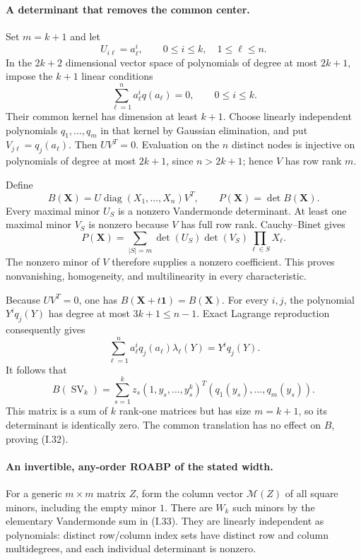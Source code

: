 \documentclass[11pt,a4paper]{article}
\theoremstyle{definition}\newtheorem{definition}{Definition}
\begin{document}
\paragraph{A determinant that removes the common center.}
Set $m=k+1$ and let
\[
 U_{i\ell}=a_\ell^i,\qquad 0\le i\le k,\quad1\le\ell\le n.
\]
In the $2k+2$ dimensional vector space of polynomials of degree
at most $2k+1$, impose the $k+1$ linear conditions
\[
 \sum_{\ell=1}^n a_\ell^i q(a_\ell)=0,
       \qquad0\le i\le k.
\]
Their common kernel has dimension at least $k+1$.
Choose linearly independent polynomials
$q_1,\ldots,q_m$ in that kernel by Gaussian elimination, and
put $V_{j\ell}=q_j(a_\ell)$.  Then $UV^T=0$.
Evaluation on the $n$ distinct nodes is injective on polynomials
of degree at most $2k+1$, since $n>2k+1$; hence $V$ has row
rank $m$.

Define
\[
 B(\mathbf X)=U\operatorname{diag}(X_1,\ldots,X_n)V^T,
 \qquad P(\mathbf X)=\det B(\mathbf X).
 \tag{I.34}
\]
Every maximal minor $U_S$ is a nonzero Vandermonde determinant.
At least one maximal minor $V_S$ is nonzero because $V$ has
full row rank.  Cauchy--Binet gives
\[
 P(\mathbf X)=\sum_{|S|=m}\det(U_S)\det(V_S)
                                  \prod_{\ell\in S}X_\ell.
\]
The nonzero minor of $V$ therefore supplies a nonzero coefficient.
This proves nonvanishing, homogeneity, and multilinearity in
every characteristic.

Because $UV^T=0$, one has $B(\mathbf X+t\mathbf1)=B(\mathbf X)$.
For every $i,j$, the polynomial $Y^i q_j(Y)$ has degree at most
$3k+1\le n-1$.  Exact Lagrange reproduction consequently gives
\[
 \sum_{\ell=1}^n a_\ell^i q_j(a_\ell)\lambda_\ell(Y)
    =Y^i q_j(Y).
\]
It follows that
\[
 B(\operatorname{SV}_k)
   =\sum_{s=1}^k z_s
       (1,y_s,\ldots,y_s^k)^T
       (q_1(y_s),\ldots,q_m(y_s)).
\]
This matrix is a sum of $k$ rank-one matrices but has size
$m=k+1$, so its determinant is identically zero.  The common
translation has no effect on $B$, proving (I.32).

\paragraph{An invertible, any-order ROABP of the stated width.}
For a generic $m\times m$ matrix $Z$, form the column vector
$\mathcal M(Z)$ of all square minors, including the empty
minor $1$.  There are $W_k$ such minors by the elementary
Vandermonde sum in (I.33).  They are linearly independent as
polynomials: distinct row/column index sets have distinct
row and column multidegrees, and each individual determinant
is nonzero.
\end{document}
